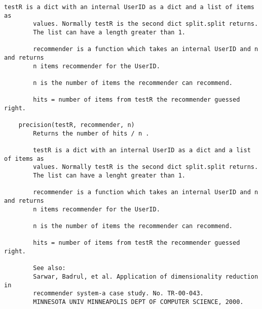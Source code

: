 \begin{lstlisting}[style=docstring]
        testR is a dict with an internal UserID as a dict and a list of items as
        values. Normally testR is the second dict split.split returns.
        The list can have a length greater than 1.
        
        recommender is a function which takes an internal UserID and n and returns
        n items recommender for the UserID.
        
        n is the number of items the recommender can recommend.
        
        hits = number of items from testR the recommender guessed right.
    
    precision(testR, recommender, n)
        Returns the number of hits / n .
        
        testR is a dict with an internal UserID as a dict and a list of items as
        values. Normally testR is the second dict split.split returns.
        The list can have a lenght greater than 1.
        
        recommender is a function which takes an internal UserID and n and returns
        n items recommender for the UserID.
        
        n is the number of items the recommender can recommend.
        
        hits = number of items from testR the recommender guessed right.
        
        See also:
        Sarwar, Badrul, et al. Application of dimensionality reduction in
        recommender system-a case study. No. TR-00-043.
        MINNESOTA UNIV MINNEAPOLIS DEPT OF COMPUTER SCIENCE, 2000.
\end{lstlisting}

